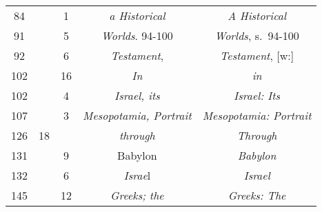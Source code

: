 \documentclass[a4paper,11pt]{article}
\begin{document}
\begin{center}
\begin{tabular}{|c|c|c|c|c|}
    84  & &  1 & \textit{a Historical} & \textit{A Historical} \\
    91  & &  5 & \textit{Worlds}. 94-100 & \textit{Worlds}, s.~94-100 \\
    92  & &  6 & \textit{Testament}, & \textit{Testament}, [w:] \\
    102 & & 16 & \textit{In} & \textit{in} \\
    102 & &  4 & \textit{Israel, its} & \textit{Israel: Its} \\
    107 & &  3 & \textit{Mesopotamia, Portrait}
           & \textit{Mesopotamia: Portrait} \\
    126 & 18 & & \textit{through} & \textit{Through} \\
    131 & &  9 & Babylon & \textit{Babylon} \\
    132 & &  6 & \textit{Israe}l & \textit{Israel} \\
    145 & & 12 & \textit{Greeks; the} & \textit{Greeks: The} \\
    \hline
  \end{tabular}






\end{center}
\end{document}
